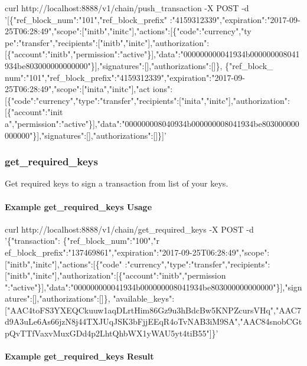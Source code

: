 \begin{DoxyCode}
curl  http:\textcolor{comment}{//localhost:8888/v1/chain/push\_transaction -X POST -d
       '[\{"ref\_block\_num":"101","ref\_block\_prefix"
      :"4159312339","expiration":"2017-09-25T06:28:49","scope":["initb","initc"],"actions":[\{"code":"currency","ty
      pe":"transfer","recipients":["initb","initc"],"authorization":[\{"account":"initb","permission":"active"\}],"data":"000000000041934b000000008041934be803000000000000"\}],"signatures":[],"authorizations":[]\},
       \{"ref\_block\_
      num":"101","ref\_block\_prefix":"4159312339","expiration":"2017-09-25T06:28:49","scope":["inita","initc"],"act
      ions":[\{"code":"currency","type":"transfer","recipients":["inita","initc"],"authorization":[\{"account":"init
      a","permission":"active"\}],"data":"000000008040934b000000008041934be803000000000000"\}],"signatures":[],"authorizations":[]\}]'}
\end{DoxyCode}
\hypertarget{group__aaciorpc_v1chaingetrequiredkeys}{}\subsubsection{get\+\_\+required\+\_\+keys}\label{group__aaciorpc_v1chaingetrequiredkeys}
Get required keys to sign a transaction from list of your keys.\hypertarget{group__aaciorpc_examplegetrequiredkeys}{}\paragraph{Example get\+\_\+required\+\_\+keys Usage}\label{group__aaciorpc_examplegetrequiredkeys}

\begin{DoxyCode}
curl  http:\textcolor{comment}{//localhost:8888/v1/chain/get\_required\_keys -X POST -d '\{"transaction":
       \{"ref\_block\_num":"100","r
      ef\_block\_prefix":"137469861","expiration":"2017-09-25T06:28:49","scope":["initb","initc"],"actions":[\{"code"
      :"currency","type":"transfer","recipients":["initb","initc"],"authorization":[\{"account":"initb","permission
      ":"active"\}],"data":"000000000041934b000000008041934be803000000000000"\}],"signatures":[],"authorizations":[]\},
       "available\_keys":["AAC4toFS3YXEQCkuuw1aqDLrtHim86Gz9u3hBdcBw5KNPZcursVHq","AAC7d9A3uLe6As66jzN8j44TXJUqJSK3bFjjEEqR4oTvNAB3iM9SA","AAC84snobCGtpQvTTfVaxvMuxGDd4p2LhtQhbWX1yWAU5yt4tiB55"]\}'}
\end{DoxyCode}
\hypertarget{group__aaciorpc_examplegetrequiredkeysresult}{}\paragraph{Example get\+\_\+required\+\_\+keys Result}\label{group__aaciorpc_examplegetrequiredkeysresult}

